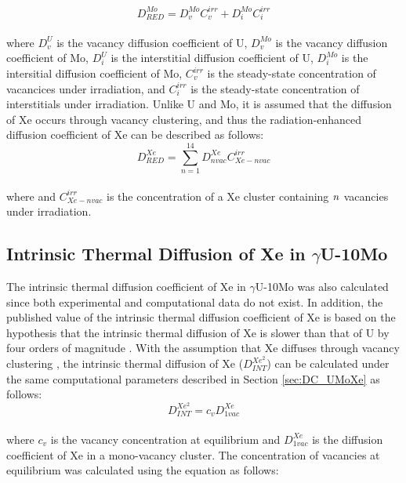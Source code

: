 \documentclass[preprint,12pt]{elsarticle}
\begin{document}
\begin{equation}
D_{RED}^{Mo}= D_{v}^{Mo}C_{v}^{irr} + D_{i}^{Mo}C_{i}^{irr}
\end{equation}
\\
\noindent where $D^{U}_{v}$ is the vacancy diffusion coefficient of U, $D^{Mo}_{v}$ is the vacancy diffusion coefficient of Mo, $D^{U}_{i}$ is the interstitial diffusion coefficient of U, $D^{Mo}_{i}$ is the intersitial diffusion coefficient of Mo, $C^{irr}_{v}$ is the steady-state concentration of vacancices under irradiation, and $C^{irr}_{i}$ is the steady-state concentration of interstitials under irradiation. Unlike U and Mo, it is assumed that the diffusion of Xe occurs through vacancy clustering, and thus the radiation-enhanced diffusion coefficient of Xe can be described as follows:\\
\begin{equation}
D^{Xe}_{RED} = \sum_{n=1}^{14} D_{nvac}^{Xe}C_{Xe-nvac}^{irr}
\end{equation}
\\
\noindent where and $C_{Xe-nvac}^{irr}$ is the concentration of a Xe cluster containing $\it{n}$ vacancies under irradiation.

\subsection{Intrinsic Thermal Diffusion of Xe in $\gamma$U-10Mo}
The intrinsic thermal diffusion coefficient of Xe in $\gamma$U-10Mo was also calculated since both experimental and computational data do not exist. In addition, the published value of the intrinsic thermal diffusion coefficient of Xe is based on the hypothesis that the intrinsic thermal diffusion of Xe is slower than that of U by four orders of magnitude \cite{hu2016formation}. 
With the assumption that Xe diffuses through vacancy clustering \cite{perriot2019atomistic, andersson2019density, andersson2011u, thompson2013pathway, bes2015experimental}, the intrinsic thermal diffusion of Xe ($D^{Xe^{2}}_{INT}$) can be calculated under the same computational parameters described in Section \ref{sec:DC_UMoXe} as follows:
\\
\begin{equation}
D^{Xe^{2}}_{INT} = c_{v}D_{1vac}^{Xe}
\end{equation}
\\
where $c_{v}$ is the vacancy concentration at equilibrium and $D_{1vac}^{Xe}$ is the diffusion coefficient of Xe in a mono-vacancy cluster. The concentration of vacancies at equilibrium was calculated using the equation as follows:
\end{document}
